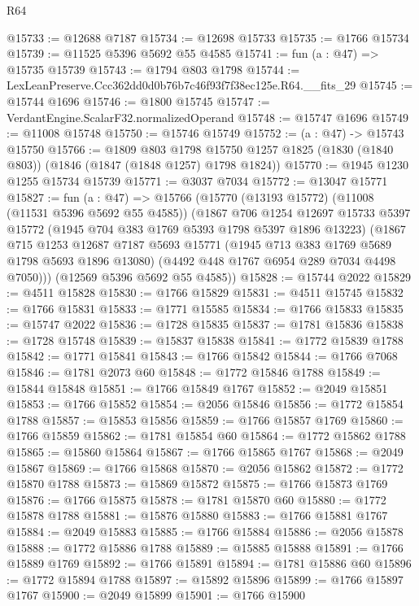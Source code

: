 \begin{lexlean}{R64}
\begin{coremodule}
@15733 := @12688 @7187
@15734 := @12698 @15733
@15735 := @1766 @15734
@15739 := @11525 @5396 @5692 @55 @4585
@15741 := fun (a : @47) => @15735 @15739
@15743 := @1794 @803 @1798
@15744 := LexLeanPreserve.Ccc362dd0d0b76b7c46f93f7f38ec125e.R64.__fits_29
@15745 := @15744 @1696
@15746 := @1800 @15745
@15747 := VerdantEngine.ScalarF32.normalizedOperand
@15748 := @15747 @1696
@15749 := @11008 @15748
@15750 := @15746 @15749
@15752 := (a : @47) -> @15743 @15750
@15766 := @1809
    @803
    @1798
    @15750
    @1257
    @1825
    (@1830 (@1840 @803))
    (@1846 (@1847 (@1848 @1257) @1798 @1824))
@15770 := @1945 @1230 @1255 @15734 @15739
@15771 := @3037 @7034
@15772 := @13047 @15771
@15827 := fun (a : @47) =>
  @15766
    (@15770
      (@13193 @15772)
      (@11008 (@11531 @5396 @5692 @55 @4585))
      (@1867
        @706
        @1254
        @12697
        @15733
        @5397
        @15772
        (@1945 @704 @383 @1769 @5393 @1798 @5397 @1896 @13223)
        (@1867
          @715
          @1253
          @12687
          @7187
          @5693
          @15771
          (@1945 @713 @383 @1769 @5689 @1798 @5693 @1896 @13080)
          (@4492 @448 @1767 @6954 @289 @7034 @4498 @7050)))
      (@12569 @5396 @5692 @55 @4585))
@15828 := @15744 @2022
@15829 := @4511 @15828
@15830 := @1766 @15829
@15831 := @4511 @15745
@15832 := @1766 @15831
@15833 := @1771 @15585
@15834 := @1766 @15833
@15835 := @15747 @2022
@15836 := @1728 @15835
@15837 := @1781 @15836
@15838 := @1728 @15748
@15839 := @15837 @15838
@15841 := @1772 @15839 @1788
@15842 := @1771 @15841
@15843 := @1766 @15842
@15844 := @1766 @7068
@15846 := @1781 @2073 @60
@15848 := @1772 @15846 @1788
@15849 := @15844 @15848
@15851 := @1766 @15849 @1767
@15852 := @2049 @15851
@15853 := @1766 @15852
@15854 := @2056 @15846
@15856 := @1772 @15854 @1788
@15857 := @15853 @15856
@15859 := @1766 @15857 @1769
@15860 := @1766 @15859
@15862 := @1781 @15854 @60
@15864 := @1772 @15862 @1788
@15865 := @15860 @15864
@15867 := @1766 @15865 @1767
@15868 := @2049 @15867
@15869 := @1766 @15868
@15870 := @2056 @15862
@15872 := @1772 @15870 @1788
@15873 := @15869 @15872
@15875 := @1766 @15873 @1769
@15876 := @1766 @15875
@15878 := @1781 @15870 @60
@15880 := @1772 @15878 @1788
@15881 := @15876 @15880
@15883 := @1766 @15881 @1767
@15884 := @2049 @15883
@15885 := @1766 @15884
@15886 := @2056 @15878
@15888 := @1772 @15886 @1788
@15889 := @15885 @15888
@15891 := @1766 @15889 @1769
@15892 := @1766 @15891
@15894 := @1781 @15886 @60
@15896 := @1772 @15894 @1788
@15897 := @15892 @15896
@15899 := @1766 @15897 @1767
@15900 := @2049 @15899
@15901 := @1766 @15900

\end{coremodule}
\end{lexlean}
